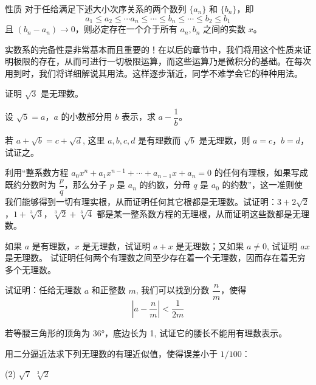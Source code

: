 \begin{Theorem}[实数系完备性]{性质}
  对于任给满足下述大小次序关系的两个数列 $\{a_n\}$ 和 $\{b_n\}$，即
\[a_1\leqslant a_2\leqslant \cdots a_n\leqslant \cdots \leqslant b_n\leqslant \cdots \leqslant b_2\leqslant b_1\]
且 $(b_n-a_n)\to 0$，则必定存在一个介于所有 $a_n,b_n$ 之间的实数 $x$。
\end{Theorem}

实数系的完备性是非常基本而且重要的！在以后的章节中，我们将用这个性质来证明极限的存在，从而可进行一切极限运算，而这些运算乃是微积分的基础。在每次用到时，我们将详细解说其用法。这样逐步渐近，同学不难学会它的种种用法。

\begin{Exercise}
\begin{question}
  \item 证明 $\sqrt{3}$ 是无理数。
  \item 设 $\sqrt{5}=a$，$a$ 的小数部分用 $b$ 表示，求 $a-\dfrac{1}{b}$。
  \item 若 $a+\sqrt{b}=c+\sqrt{d}$, 这里 $a,b,c,d$ 是有理数而 $\sqrt{b}$ 是无理数，则 $a=c$，$b=d$，试证之。
  \item 利用“整系数方程 $a_0x^n+a_1x^{n-1}+\cdots+a_{n-1}x+a_n=0$ 的任何有理根，如果写成既约分数时为 $\dfrac{p}{q}$，那么分子 $p$ 是 $a_n$ 的约数，分母 $q$ 是 $a_0$ 的约数”，这一准则使我们能够得到一切有理实根，从而证明任何其它根都是无理数。试证明：$3+2\sqrt{2}$，$1+\sqrt[3]{3}$，$\sqrt[3]{2}+\sqrt[3]{4}$ 都是某一整系数方程的无理根，从而证明这些数都是无理数。
  \item 
  \begin{tasks}
    \task 如果 $a$ 是有理数，$x$ 是无理数，试证明 $a+x$ 是无理数；又如果 $a \neq 0$, 试证明 $ax$ 是无理数。
    \task 试证明任何两个有理数之间至少存在着一个无理数，因而存在着无穷多个无理数。
  \end{tasks}
  \item 试证明：任给无理数 $a$ 和正整数 $m$, 我们可以找到分数 $\dfrac{n}{m}$，使得 \[\left|a-\frac{n}{m}\right|<\frac{1}{2m}\]
  \item 若等腰三角形的顶角为 \ang{36}，底边长为 1, 试证它的腰长不能用有理数表示。
  \item 用二分逼近法求下列无理数的有理近似值，使得误差小于 $1/100$：
    \begin{tasks}(2)
        \task $\sqrt{7}$
        \task $\sqrt[3]{2}$
    \end{tasks}
\end{question}
\end{Exercise}

